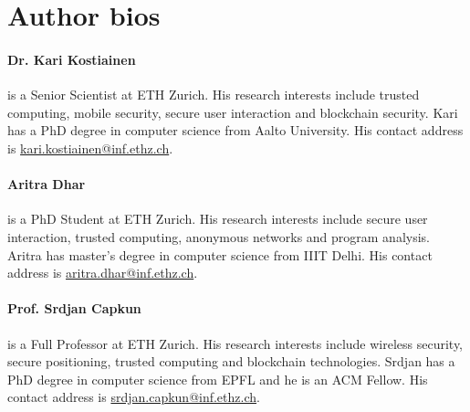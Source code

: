 
\section*{Author bios}

\paragraph{Dr. Kari Kostiainen} is a Senior Scientist at ETH Zurich. His research interests include trusted computing, mobile security, secure user interaction and blockchain security. Kari has a PhD degree in computer science from Aalto University. His contact address is \url{kari.kostiainen@inf.ethz.ch}.

\paragraph{Aritra Dhar} is a PhD Student at ETH Zurich. His research interests include secure user interaction, trusted computing, anonymous networks and program analysis. Aritra has master's degree in computer science from IIIT Delhi. His contact address is \url{aritra.dhar@inf.ethz.ch}.

\paragraph{Prof. Srdjan Capkun} is a Full Professor at ETH Zurich. His research interests include wireless security, secure positioning, trusted computing and blockchain technologies. Srdjan has a PhD degree in computer science from EPFL and he is an ACM Fellow. His contact address is \url{srdjan.capkun@inf.ethz.ch}.
